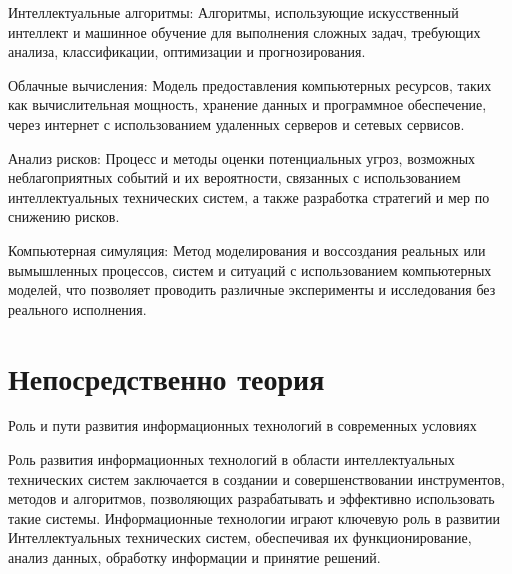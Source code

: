     Интеллектуальные алгоритмы: Алгоритмы, использующие искусственный интеллект и машинное обучение для выполнения сложных задач, требующих анализа, классификации, оптимизации и прогнозирования.
    
    Облачные вычисления: Модель предоставления компьютерных ресурсов, таких как вычислительная мощность, хранение данных и программное обеспечение, через интернет с использованием удаленных серверов и сетевых сервисов.
    
    Анализ рисков: Процесс и методы оценки потенциальных угроз, возможных неблагоприятных событий и их вероятности, связанных с использованием интеллектуальных технических систем, а также разработка стратегий и мер по снижению рисков.
    
    Компьютерная симуляция: Метод моделирования и воссоздания реальных или вымышленных процессов, систем и ситуаций с использованием компьютерных моделей, что позволяет проводить различные эксперименты и исследования без реального исполнения.
    
    \section{Непосредственно теория}
    Роль и пути развития информационных технологий в современных условиях

    Роль развития информационных технологий в области интеллектуальных технических систем заключается в создании и совершенствовании инструментов, методов и алгоритмов, позволяющих разрабатывать и эффективно использовать такие системы. Информационные технологии играют ключевую роль в развитии Интеллектуальных технических систем, обеспечивая их функционирование, анализ данных, обработку информации и принятие решений.

